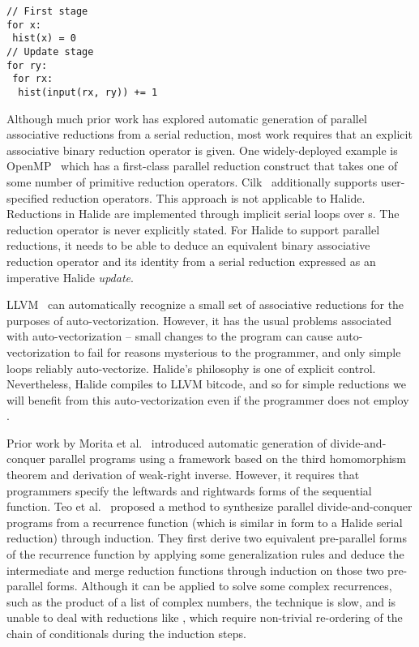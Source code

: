 \begin{lstlisting}[float,caption={Computing the histogram of an image is hard to parallelize in Halide, since its update stage would be expressed with serial \code{RVar}s.}, label={lst:histogram_loopness}]
// First stage
for x:
 hist(x) = 0
// Update stage
for ry:
 for rx:
  hist(input(rx, ry)) += 1
\end{lstlisting}

Although much prior work has explored automatic generation of parallel associative reductions from a serial reduction, most work requires that an explicit associative binary reduction operator is given. One widely-deployed example is OpenMP~\cite{Dagum:1998:OIA:615255.615542} which has a first-class parallel reduction construct that takes one of some number of primitive reduction operators. Cilk~\cite{Blumofe:1995:CEM:209936.209958} additionally supports user-specified reduction operators. This approach is not applicable to Halide. Reductions in Halide are implemented through implicit serial loops over s. The reduction operator is never explicitly stated. For Halide to support parallel reductions, it needs to be able to deduce an equivalent binary associative reduction operator and its identity from a serial reduction expressed as an imperative Halide \emph{update}.

LLVM~\cite{Lattner:2004:LCF:977395.977673} can automatically recognize a small set of associative reductions for the purposes of auto-vectorization. However, it has the usual problems associated with auto-vectorization -- small changes to the program can cause auto-vectorization to fail for reasons mysterious to the programmer, and only simple loops reliably auto-vectorize. Halide's philosophy is one of explicit control. Nevertheless, Halide compiles to LLVM bitcode, and so for simple reductions we will benefit from this auto-vectorization even if the programmer does not employ .

Prior work by Morita et al.~\cite{Morita:2007:AIG:1250734.1250752} introduced automatic generation of divide-and-conquer parallel programs using a framework based on the third homomorphism theorem and derivation of weak-right inverse. However, it requires that programmers specify the leftwards and rightwards forms of the sequential function. Teo et al.~\cite{Teo:1997:DEP:266670.266697} proposed a method to synthesize parallel divide-and-conquer
programs from a recurrence function (which is similar in form to a Halide serial reduction) through induction. They first derive two equivalent pre-parallel forms of the recurrence function by applying some generalization rules and deduce the intermediate and merge reduction functions through induction on those two pre-parallel forms. Although it can be applied to solve some complex recurrences, such as the product of a list of complex numbers, the technique is slow, and is unable to deal with reductions like , which require non-trivial re-ordering of the chain of conditionals during the induction steps.

